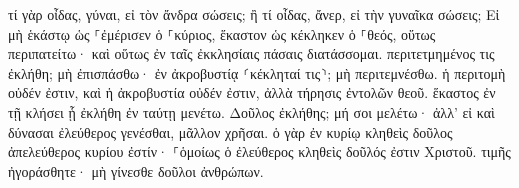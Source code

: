 \documentclass{openreader}
\begin{document}
τί γὰρ οἶδας, γύναι, εἰ τὸν ἄνδρα σώσεις; ἢ τί οἶδας, ἄνερ, εἰ τὴν γυναῖκα σώσεις; 
Εἰ μὴ ἑκάστῳ ὡς ⸀ἐμέρισεν ὁ ⸀κύριος, ἕκαστον ὡς κέκληκεν ὁ ⸀θεός, οὕτως περιπατείτω· καὶ οὕτως ἐν ταῖς ἐκκλησίαις πάσαις διατάσσομαι. 
περιτετμημένος τις ἐκλήθη; μὴ ἐπισπάσθω· ἐν ἀκροβυστίᾳ ⸂κέκληταί τις⸃; μὴ περιτεμνέσθω. 
ἡ περιτομὴ οὐδέν ἐστιν, καὶ ἡ ἀκροβυστία οὐδέν ἐστιν, ἀλλὰ τήρησις ἐντολῶν θεοῦ. 
ἕκαστος ἐν τῇ κλήσει ᾗ ἐκλήθη ἐν ταύτῃ μενέτω. 
Δοῦλος ἐκλήθης; μή σοι μελέτω· ἀλλ’ εἰ καὶ δύνασαι ἐλεύθερος γενέσθαι, μᾶλλον χρῆσαι. 
ὁ γὰρ ἐν κυρίῳ κληθεὶς δοῦλος ἀπελεύθερος κυρίου ἐστίν· ⸀ὁμοίως ὁ ἐλεύθερος κληθεὶς δοῦλός ἐστιν Χριστοῦ. 
τιμῆς ἠγοράσθητε· μὴ γίνεσθε δοῦλοι ἀνθρώπων. 
\end{document}
